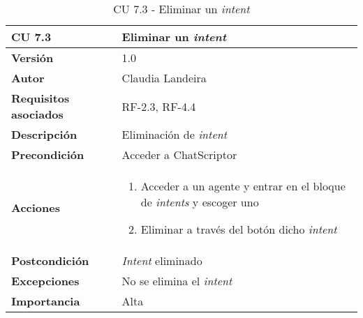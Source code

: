 \begin{table}[p]
	\centering
	\begin{tabularx}{\linewidth}{ p{} p{} }
		\toprule
		\textbf{CU 7.3}    & \textbf{Eliminar un \textit{intent}}\\
		\toprule
		\textbf{Versión}              & 1.0    \\
		\textbf{Autor}                & Claudia Landeira \\
		\textbf{Requisitos asociados} & RF-2.3, RF-4.4\\
		\textbf{Descripción}          & Eliminación de \textit{intent}\\
		\textbf{Precondición}         & Acceder a ChatScriptor\\
		\textbf{Acciones}             &
		\begin{enumerate}
			\def\labelenumi{\arabic{enumi}.}
			\tightlist
                \item Acceder a un agente y entrar en el bloque de \textit{intents} y escoger uno
                \item Eliminar a través del botón dicho \textit{intent}
		\end{enumerate}\\
		\textbf{Postcondición}        & \textit{Intent} eliminado  \\
		\textbf{Excepciones}          & No se elimina el \textit{intent} \\
		\textbf{Importancia}          & Alta \\
		\bottomrule
	\end{tabularx}
	\caption{CU 7.3 - Eliminar un \textit{intent}}
\end{table}

